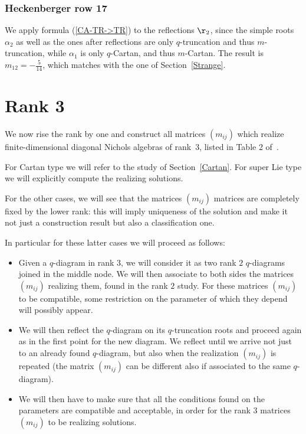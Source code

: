 \documentclass[10pt,a4paper]{amsart}
\numberwithin{equation}{section}
\begin{document}
\subsubsection*{Heckenberger row 17}
We apply formula (\ref{CA-TR->TR}) to the reflections $\r_2$, since the simple roots $\alpha_2$ as well as the ones after reflections are only $q$-truncation and thus $m$-truncation, while $\alpha_1$ is only $q$-Cartan, and thus $m$-Cartan. The result is $m_{12}=-\frac{5}{14}$, which matches with the one of Section~\ref{Strange}.


\section{Rank 3}\label{rank3}
We now rise the rank by one and construct all matrices $(m_{ij})$ which realize finite-dimensional diagonal Nichols algebras of rank~$3$, listed in Table 2 of~\cite{Hecklist}.

For Cartan type we will refer to the study of Section~\ref{Cartan}.
For super Lie type we will explicitly compute the realizing solutions.

For the other cases, we will see that the matrices $(m_{ij})$ matrices are completely fixed by the lower rank: this will imply uniqueness of the solution and make it not just a construction result but also a classification one.

In particular for these latter cases we will proceed as follows:
\begin{itemize}\itemsep=0pt
 	\item Given a $q$-diagram in rank $3$, we will consider it as two rank $2$ $q$-diagrams joined in the middle node. We will then associate to both sides the matrices $(m_{ij})$ realizing them, found in the rank $2$ study.
For these matrices $(m_{ij})$ to be compatible, some restriction on the parameter of which they depend will possibly appear.
 	\item We will then reflect the $q$-diagram on its $q$-truncation roots and proceed again as in the first point for the new diagram.
 	We reflect until we arrive not just to an already found $q$-diagram, but also when the realization $(m_{ij})$ is repeated (the matrix $(m_{ij})$ can be different also if associated to the same $q$-diagram).
 	\item We will then have to make sure that all the conditions found on the parameters are compatible and acceptable, in order for the rank $3$ matrices $(m_{ij})$ to be realizing solutions.
\end{itemize}
\end{document}
